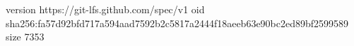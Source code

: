 version https://git-lfs.github.com/spec/v1
oid sha256:fa57d92bfd717a594aad7592b2c5817a2444f18aeeb63e90bc2ed89bf2599589
size 7353
